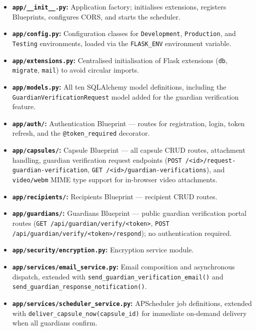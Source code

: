 \documentclass[12pt, a4paper]{article}
\begin{document}
\begin{itemize}
  \item \textbf{\texttt{app/\_\_init\_\_.py}:} Application factory; initialises extensions, registers Blueprints, configures CORS, and starts the scheduler.
  \item \textbf{\texttt{app/config.py}:} Configuration classes for \texttt{Development}, \texttt{Production}, and \texttt{Testing} environments, loaded via the \texttt{FLASK\_ENV} environment variable.
  \item \textbf{\texttt{app/extensions.py}:} Centralised initialisation of Flask extensions (\texttt{db}, \texttt{migrate}, \texttt{mail}) to avoid circular imports.
  \item \textbf{\texttt{app/models.py}:} All ten SQLAlchemy model definitions, including the \texttt{GuardianVerificationRequest} model added for the guardian verification feature.
  \item \textbf{\texttt{app/auth/}:} Authentication Blueprint — routes for registration, login, token refresh, and the \texttt{@token\_required} decorator.
  \item \textbf{\texttt{app/capsules/}:} Capsule Blueprint — all capsule CRUD routes, attachment handling, guardian verification request endpoints (\texttt{POST /<id>/request-guardian-verification}, \texttt{GET /<id>/guardian-verifications}), and \texttt{video/webm} MIME type support for in-browser video attachments.
  \item \textbf{\texttt{app/recipients/}:} Recipients Blueprint — recipient CRUD routes.
  \item \textbf{\texttt{app/guardians/}:} Guardians Blueprint — public guardian verification portal routes (\texttt{GET /api/guardian/verify/<token>}, \texttt{POST /api/guardian/verify/<token>/respond}); no authentication required.
  \item \textbf{\texttt{app/security/encryption.py}:} Encryption service module.
  \item \textbf{\texttt{app/services/email\_service.py}:} Email composition and asynchronous dispatch, extended with \texttt{send\_guardian\_verification\_email()} and \texttt{send\_guardian\_response\_notification()}.
  \item \textbf{\texttt{app/services/scheduler\_service.py}:} APScheduler job definitions, extended with \texttt{deliver\_capsule\_now(capsule\_id)} for immediate on-demand delivery when all guardians confirm.
\end{itemize}
\end{document}
